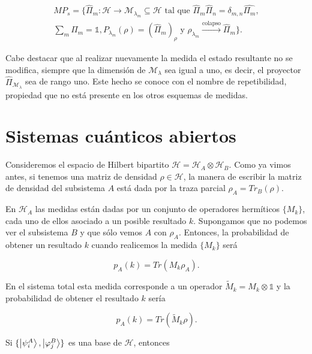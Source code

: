 \begin{equation}
    \begin{array}{r}
    MP_s = \{\hat{\Pi}_m: \mathcal{H} \rightarrow \mathcal{M}_{\lambda_m} \subseteq \mathcal{H} \text{ tal que } \hat{\Pi}_m \hat{\Pi}_n = \delta_{m,n} \hat{\Pi_m}, \\
    \sum\limits_m \hat{\Pi}_m = \mathds{1}, P_{\lambda_m}(\rho) = (\hat{\Pi}_m)_\rho \text{ y } \rho_{\lambda_m} \xrightarrow{\text{colapso}} \hat{\Pi}_m\} .
    \end{array}
\end{equation}

Cabe destacar que al realizar nuevamente la medida el estado resultante no se modifica, siempre que la dimensión de $\mathcal{M}_\lambda$ sea igual a uno, es decir, el proyector $\hat{\Pi}_{\mathcal{M}_\lambda}$ sea de rango uno. Este hecho se conoce con el nombre de repetibilidad, propiedad que no está presente en los otros esquemas de medidas.

\section{Sistemas cuánticos abiertos}

Consideremos el espacio de Hilbert bipartito $\mathcal{H} = \mathcal{H}_A \otimes \mathcal{H}_B$. Como ya vimos antes, si tenemos una matriz de densidad $\rho \in \mathcal{H}$, la manera de escribir la matriz de densidad del subsistema $A$ está dada por la traza parcial $\rho_A = Tr_B(\rho)$.

En $\mathcal{H}_A$ las medidas están dadas por un conjunto de operadores hermíticos $\{M_k\}$, cada uno de ellos asociado a un posible resultado $k$. Supongamos que no podemos ver el subsistema $B$ y que sólo vemos $A$ con $\rho_A$. Entonces, la probabilidad de obtener un resultado $k$ cuando realicemos la medida $\{M_k\}$ será

\begin{equation}
    p_A(k) = Tr(M_k \rho_A) .
\end{equation}

En el sistema total esta medida corresponde a un operador $\tilde{M}_k = M_k \otimes \mathds{1}$ y la probabilidad de obtener el resultado $k$ sería

\begin{equation}
    p_A(k) = Tr(\tilde{M}_k \rho) .
\end{equation}

Si $\{\ket{\psi_i^A}, \ket{\varphi_j^B}\}$ es una base de $\mathcal{H}$, entonces


